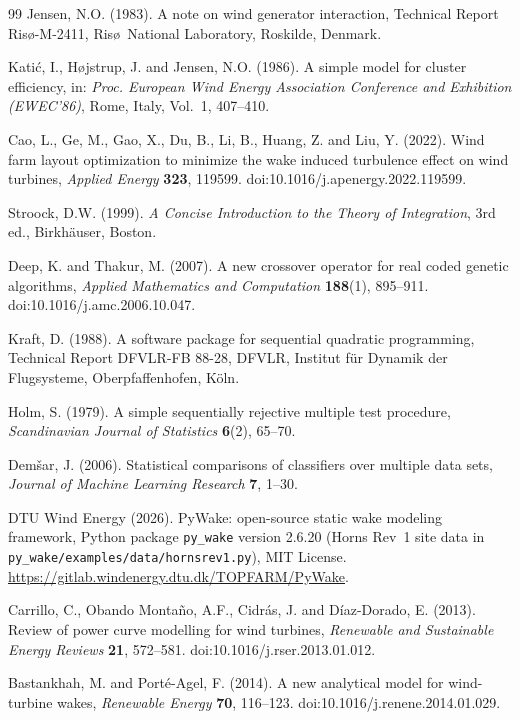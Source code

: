\documentclass[journal,twoside]{IEEEtran}
\begin{document}
\begin{thebibliography}{99}
Jensen, N.O. (1983). A note on wind generator interaction, Technical Report Ris\o-M-2411, Ris\o\ National Laboratory, Roskilde, Denmark.

Kati\'c, I., H\o jstrup, J. and Jensen, N.O. (1986). A simple model for cluster efficiency, in: \textit{Proc. European Wind Energy Association Conference and Exhibition (EWEC'86)}, Rome, Italy, Vol.~1, 407--410.

Cao, L., Ge, M., Gao, X., Du, B., Li, B., Huang, Z. and Liu, Y. (2022). Wind farm layout optimization to minimize the wake induced turbulence effect on wind turbines, \textit{Applied Energy} \textbf{323}, 119599. doi:10.1016/j.apenergy.2022.119599.

Stroock, D.W. (1999). \textit{A Concise Introduction to the Theory of Integration}, 3rd ed., Birkh\"auser, Boston.

Deep, K. and Thakur, M. (2007). A new crossover operator for real coded genetic algorithms, \textit{Applied Mathematics and Computation} \textbf{188}(1), 895--911. doi:10.1016/j.amc.2006.10.047.

Kraft, D. (1988). A software package for sequential quadratic programming, Technical Report DFVLR-FB 88-28, DFVLR, Institut f\"ur Dynamik der Flugsysteme, Oberpfaffenhofen, K\"oln.

Holm, S. (1979). A simple sequentially rejective multiple test procedure, \textit{Scandinavian Journal of Statistics} \textbf{6}(2), 65--70.

Dem\v{s}ar, J. (2006). Statistical comparisons of classifiers over multiple data sets, \textit{Journal of Machine Learning Research} \textbf{7}, 1--30.

DTU Wind Energy (2026). PyWake: open-source static wake modeling framework, Python package \texttt{py\_wake} version 2.6.20 (Horns Rev~1 site data in \texttt{py\_wake/examples/data/hornsrev1.py}), MIT License. \url{https://gitlab.windenergy.dtu.dk/TOPFARM/PyWake}.

Carrillo, C., Obando Monta\~no, A.F., Cidr\'as, J. and D\'iaz-Dorado, E. (2013). Review of power curve modelling for wind turbines, \textit{Renewable and Sustainable Energy Reviews} \textbf{21}, 572--581. doi:10.1016/j.rser.2013.01.012.

Bastankhah, M. and Port\'e-Agel, F. (2014). A new analytical model for wind-turbine wakes, \textit{Renewable Energy} \textbf{70}, 116--123. doi:10.1016/j.renene.2014.01.029.

\end{thebibliography}
\end{document}

